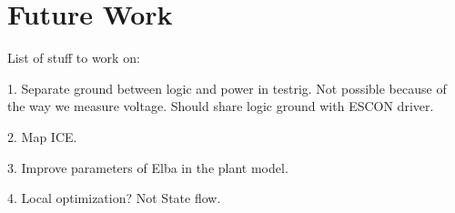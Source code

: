 \chapter{Future Work}

List of stuff to work on:

1. Separate ground between logic and power in testrig. Not possible because of the way we measure voltage. Should share logic ground with ESCON driver.

2. Map ICE.

3. Improve parameters of Elba in the plant model.

4. Local optimization? Not State flow.



